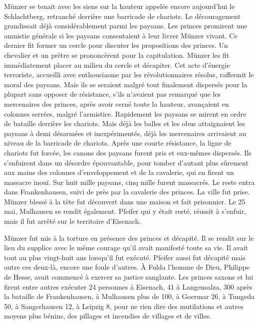 \documentclass[french,twoside]{book} %
\begin{document}
Münzer se tenait avec les siens sur la hauteur appelée encore aujourd’hui le Schlachtberg, retranché derrière une barricade de chariots. Le découragement grandissait déjà considérablement parmi les paysans. Les princes promirent une amnistie générale si les paysans consentaient à leur livrer Münzer vivant. Ce dernier fit former un cercle pour discuter les propositions des princes. Un chevalier et un prêtre se prononcèrent pour la capitulation. Münzer les fit immédiatement placer au milieu du cercle et décapiter. Cet acte d’énergie terroriste, accueilli avec enthousiasme par les révolutionnaires résolus, raffermit le moral des paysans. Mais ils se seraient malgré tout finalement dispersés pour la plupart sans opposer de résistance, s’ils n’avaient pas remarqué que les mercenaires des princes, après avoir cerné toute la hauteur, avançaient en colonnes serrées, malgré l’armistice. Rapidement les paysans se mirent en ordre de bataille derrière les chariots. Mais déjà les balles et les obus attaignaient les paysans à demi désarmées et inexpérimentés, déjà les mercenaires arrivaient au niveau de la barricade de chariots. Après une courte résistance, la ligne de chariots fut forcée, les canons des paysans furent pris et eux-mêmes dispersés. Ils s’enfuirent dans un désordre épouvantable, pour tomber d’autant plus sûrement aux mains des colonnes d’enveloppement et de la cavalerie, qui en firent un massacre inouï. Sur huit mille paysans, cinq mille furent massacrés. Le reste entra dans Frankenhausen, suivi de près par la cavalerie des princes. La ville fut prise. Münzer blessé à la tête fut découvert dans une maison et fait prisonnier. Le 25 mai, Mulhausen se rendit également. Pfeifer qui y était resté, réussit à s’enfuir, mais il fut arrêté sur le territoire d’Eisenach.\par
Münzer fut mis à la torture en présence des princes et décapité. Il se rendit sur le lieu du supplice avec le même courage qu’il avait manifesté toute sa vie. Il avait tout au plus vingt-huit ans lorsqu’il fut exécuté. Pfeifer aussi fut décapité mais outre ces deux-là, encore une foule d’autres. À Fulda l’homme de Dieu, Philippe de Hesse, avait commencé à exercer sa justice sanglante. Les princes saxons et lui firent entre autres exécuter 24 personnes à Eisenach, 41 à Langensalza, 300 après la bataille de Frankenhausen, à Mulhausen plus de 100, à Goermar 26, à Tungeda 50, à Sangerhausen 12, à Leipzig 8, pour ne rien dire des mutilations et autres moyens plus bénins, des pillages et incendies de villages et de villes.\par
\end{document}

